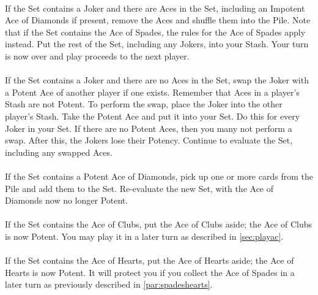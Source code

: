 \documentclass{article}
\begin{document}
\paragraph{\label{par:jokersetaces}}
If the Set contains a Joker and there are Aces in the Set, including an
Impotent Ace of Diamonds if present, remove the Aces and shuffle them into the
Pile. Note that if the Set contains the Ace of Spades, the rules for the Ace of
Spades apply instead. Put the rest of the Set, including any Jokers, into your
Stash. Your turn is now over and play proceeds to the next player.

\paragraph{\label{par:jokersetnoaces}}
If the Set contains a Joker and there are no Aces in the Set, swap the
Joker with a Potent Ace of another player if one exists.  Remember that
Aces in a player's Stash are not Potent. To perform the swap, place the
Joker into the other player's Stash. Take the Potent Ace and put it into
your Set. Do this for every Joker in your Set. If there are no Potent
Aces, then you many not perform a swap. After this, the Jokers lose
their Potency. Continue to evaluate the Set, including any swapped Aces.

\paragraph{\label{par:setdiamonds}}
If the Set contains a Potent Ace of Diamonds, pick up one or more cards
from the Pile and add them to the Set. Re-evaluate the new Set, with the
Ace of Diamonds now no longer Potent.

\paragraph{\label{par:setclubs}}
If the Set contains the Ace of Clubs, put the Ace of Clubs aside; the
Ace of Clubs is now Potent. You may play it in a later turn as described
in \autoref{sec:playac}.

\paragraph{\label{par:sethearts}}
If the Set contains the Ace of Hearts, put the Ace of Hearts aside; the
Ace of Hearts is now Potent. It will protect you if you collect the Ace
of Spades in a later turn as previously described in
\autoref{par:spadeshearts}.
\end{document}
